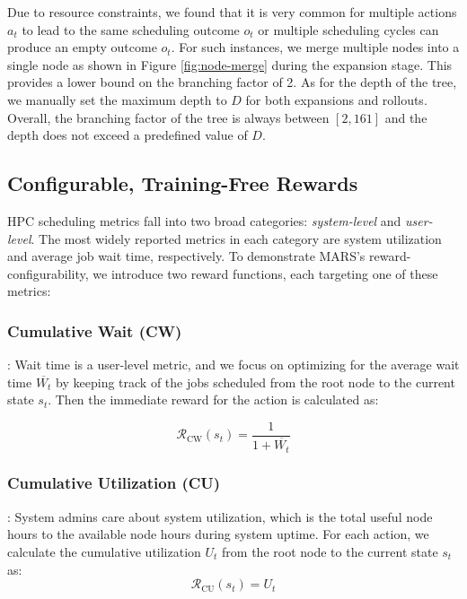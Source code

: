 \documentclass[conference]{IEEEtran}
\begin{document}
Due to resource constraints, we found that it is very common for multiple actions $a_t$ to lead to the same scheduling outcome $o_t$ or multiple scheduling cycles can produce an empty outcome $o_t$. For such instances, we merge multiple nodes into a single node as shown in Figure \ref{fig:node-merge} during the expansion stage. This provides a lower bound on the branching factor of 2. As for the depth of the tree, we manually set the maximum depth to $D$ for both expansions and rollouts. Overall, the branching factor of the tree is always between $[2,161]$ and the depth does not exceed a predefined value of $D$.


\subsection{Configurable, Training-Free Rewards}
\label{sec:rewards}

HPC scheduling metrics fall into two broad categories: \emph{system-level} and \emph{user-level}. The most widely reported metrics in each category are system utilization and average job wait time, respectively. To demonstrate MARS's reward-configurability, we introduce two reward functions, each targeting one of these metrics:


\subsubsection{Cumulative Wait (CW)}: Wait time is a user-level metric, and we focus on optimizing for the average wait time $\overline{W_t}$ by keeping track of the jobs scheduled from the root node to the current state $s_t$. Then the immediate reward for the action is calculated as:

\begin{equation}
    \mathcal{R}_{\text{CW}}(s_t) = \frac{1}{1 + \overline{W_t}}
\end{equation}

\subsubsection{Cumulative Utilization (CU)}: System admins care about system utilization, which is the total useful node hours to the available node hours during system uptime. For each action, we calculate the cumulative utilization $U_t$ from the root node to the current state $s_t$ as:
\begin{equation}
    \mathcal{R}_{\text{CU}}(s_t) = U_t
\end{equation}
\end{document}
